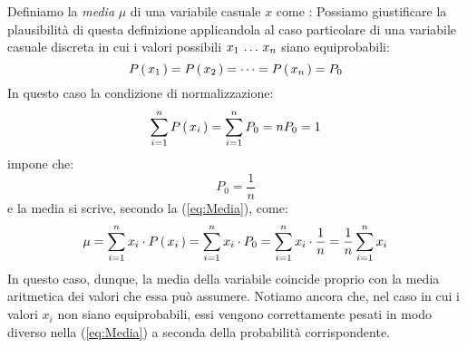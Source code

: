 Definiamo la {\itshape media} $\mu$ di una variabile casuale $x$ come
:
Possiamo giustificare la plausibilit\`a di questa definizione applicandola
al caso particolare di una variabile casuale discreta in cui i valori
possibili $\fromto{x_1}{x_n}$ siano equiprobabili:
$$
\prob{x_1} = \prob{x_2} = \cdots =  \prob{x_n} = P_0
$$
In questo caso la condizione di normalizzazione:
$$
\dsum{\prob{x_i}}{i}{1}{n} = \dsum{P_0}{i}{1}{n} = n P_0 = 1
$$
impone che:
$$
P_0 = \frac{1}{n}
$$
e la media si scrive, secondo la (\ref{eq:Media}), come:
$$
\mu = \dsum{x_i}{i}{1}{n} \cdot \prob{x_i} =
\dsum{x_i}{i}{1}{n} \cdot P_0 =
\dsum{x_i}{i}{1}{n} \cdot \frac{1}{n} =
\frac{1}{n} \dsum{x_i}{i}{1}{n}
$$
In questo caso, dunque, la media della variabile coincide proprio con la
media aritmetica dei valori che essa pu\`o assumere.
Notiamo ancora che, nel caso in cui i  valori $x_i$ non siano equiprobabili,
essi vengono correttamente pesati in modo diverso nella (\ref{eq:Media}) a
seconda della probabilit\`a corrispondente.

